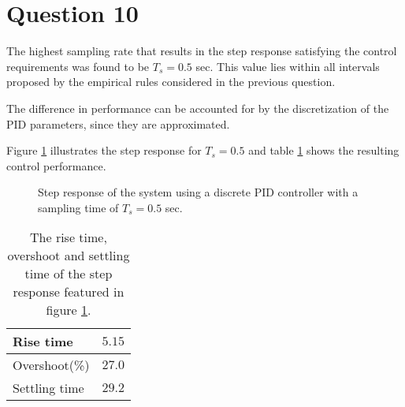 \section{Question 10}

The highest sampling rate that results in the step response satisfying the
control requirements was found to be $T_s = 0.5$ sec. This value lies within
all intervals proposed by the empirical rules considered in the previous question.

The difference in performance can be accounted for by the discretization of the
PID parameters, since they are approximated.

Figure \ref{fig:Q10.response} illustrates the step response for $T_s = 0.5$ and
table \ref{tbl:Q10.requirements} shows the resulting control performance.

\begin{figure}[H]\centering
	\centering
	\scalebox{1}{}
  \caption{Step response of the system using a discrete PID controller with a
    sampling time of $T_s=0.5$ sec.}
  \label{fig:Q10.response}
\end{figure}

\begin{table}[H]\centering
    \begin{tabular}{l|l}
    Rise time         & $5.15$ \\ \hline
    Overshoot(\%)     & $27.0$ \\ \hline
    Settling time     & $29.2$ \\ \hline
    \end{tabular}
    \caption{The rise time, overshoot and settling time of the step response
      featured in figure \ref{fig:Q10.response}.}
    \label{tbl:Q10.requirements}
\end{table}
